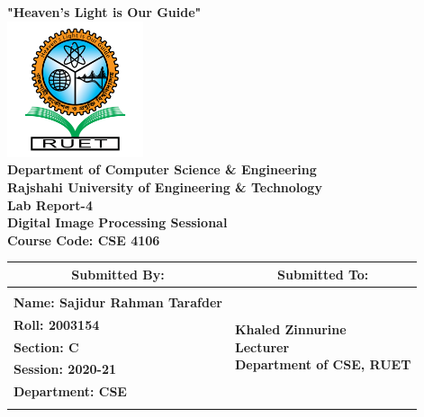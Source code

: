 \documentclass[12pt,a4paper]{report}
\begin{document}
\begin{titlepage}
    \thispagestyle{empty}
    \centering
    \vspace*{0.5cm}
    {\large \textbf{"Heaven's Light is Our Guide"}}\\[0.3cm]
    \includegraphics[width=4cm]{ruet_logo.png}\\[0.4cm]
    {\Large \textbf{Department of Computer Science \& Engineering}}\\[0.3cm]
    {\large \textbf{Rajshahi University of Engineering \& Technology}}\\[0.8cm]
    {\LARGE \textbf{Lab Report-4}}\\[0.5cm]
    {\LARGE \textbf{Digital Image Processing Sessional}}\\[0.5cm]
    {\LARGE \textbf{Course Code: CSE 4106}}\\[0.3cm]

    \vspace{0.8cm}
    \begin{table}[h!]
    \centering
    \setlength{\arrayrulewidth}{1.5pt}
    \renewcommand{\arraystretch}{1.5}
    \begin{tabular}{|p{8.5cm}|p{6.5cm}|}
        \hline
        \multicolumn{1}{|c|}{\large \textbf{Submitted By:}} & \multicolumn{1}{c|}{\large \textbf{Submitted To:}} \\
        \hline
        & \\
        \large \textbf{Name: Sajidur Rahman Tarafder} & \multirow{5}{*}{\parbox{6.5cm}{\centering 
        \large \textbf{Khaled Zinnurine}\\
        \vspace{0.2cm}
        \large \textbf{Lecturer}\\
        \vspace{0.2cm}
        \large \textbf{Department of CSE, RUET}}}\\
        \large \textbf{Roll: 2003154} & \\
        \large \textbf{Section: C} & \\
        \large \textbf{Session: 2020-21} & \\
        \large \textbf{Department: CSE} & \\
        & \\
        \hline
    \end{tabular}
    \end{table}
\end{titlepage}
\end{document}
